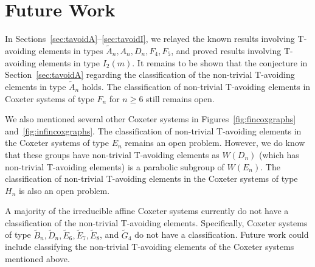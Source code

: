 \section{Future Work}
In Sections~\ref{sec:tavoidA}--\ref{sec:tavoidI}, we relayed the known results involving T-avoiding elements in types $\widetilde{A}_n, A_n, D_n, F_4, F_5$, and proved results involving T-avoiding elements in type $I_2(m)$. It remains to be shown that the conjecture in Section~\ref{sec:tavoidA} regarding the classification of the non-trivial T-avoiding elements in type $\widetilde{A}_n$ holds. The classification of non-trivial T-avoiding elements in Coxeter systems of type $F_n$ for $n \geq 6$ still remains open.

We also mentioned several other Coxeter systems in Figures~\ref{fig:fincoxgraphs} and~\ref{fig:infincoxgraphs}. The classification of non-trivial T-avoiding elements in the Coxeter systems of type $E_n$ remains an open problem. However, we do know that these groups have non-trivial T-avoiding elements as $W(D_n)$ (which has non-trivial T-avoiding elements) is a parabolic subgroup of $W(E_n)$. The classification of non-trivial T-avoiding elements in the Coxeter systems of type $H_n$ is also an open problem. 

A majority of the irreducible affine Coxeter systems  currently do not have a classification of the non-trivial T-avoiding elements. Specifically, Coxeter systems of type $\widetilde{B}_n, \widetilde{D}_n, \widetilde{E}_6, \widetilde{E}_7, \widetilde{E}_8$, and $\widetilde{G}_4$ do not have a classification. Future work could include classifying the non-trivial T-avoiding elements of the Coxeter systems mentioned above.